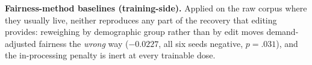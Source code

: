 \textbf{Fairness-method baselines (training-side).} Applied on the raw corpus
where they usually live, neither reproduces any part of the recovery that
editing provides: reweighing \cite{kamirancalders2012} by demographic group
rather than by edit moves demand-adjusted
fairness the \emph{wrong} way ($-0.0227$, all six seeds negative,
$p = .031$), and the in-processing penalty \cite{zheng2023} is inert at
every trainable dose.


